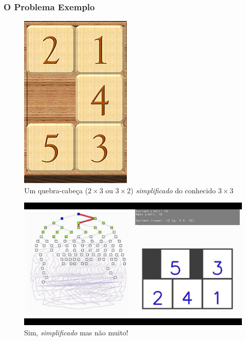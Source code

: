 \begin{frame}[fragile, allowframebreaks=0.9]
  \frametitle{O Problema Exemplo}

\begin{figure}[!htb]
\centering
\includegraphics[width=.3\textwidth, height=0.40\textheight]{figures/puzzle_2x3_01.jpg}
\caption{Um quebra-cabeça ($2\times 3$ ou $3\times 2$) \textit{simplificado} do conhecido $3\times 3$}
\end{figure}


\framebreak
\begin{figure}[!htb]
\centering
\includegraphics[width=.75\textwidth, height=0.65\textheight]{figures/puzzle_2x3_02.jpg}
\caption{Sim, \textit{simplificado} mas não muito!}
\end{figure}

\end{frame}

